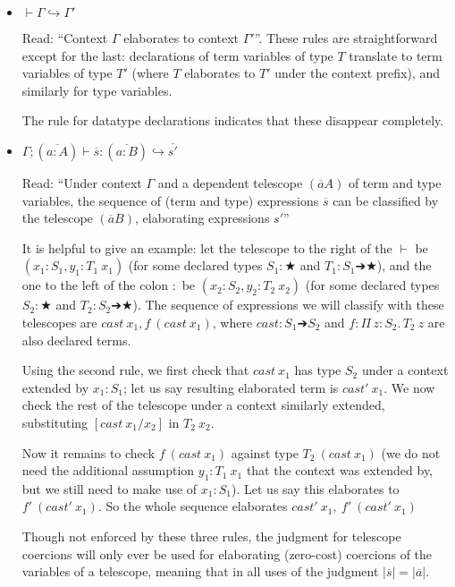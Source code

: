 \documentclass{article}
\newcommand{\ann}[2]{#1\! : \! #2}
\newcommand{\abs}[4]{{#1}\, #2\! : \! #3.\, #4}
\newcommand{\vars}[1]{{\overline{#1}}}
\newcommand{\elab}{\hookrightarrow}
\begin{document}
\begin{itemize}
\item \(\vdash \Gamma \elab \Gamma'\)

  Read: ``Context $\Gamma$ elaborates to context $\Gamma'$''. These rules are
  straightforward except for the last: declarations of term variables of type
  $T$ translate to term variables of type $T'$ (where $T$ elaborates to $T'$
  under the context prefix), and similarly for type variables.

  The rule for datatype declarations indicates that these disappear completely.

\item \(\Gamma ; (\vars{\ann{a}{A}}) \vdash \vars{s} : (\vars{\ann{a}{B}}) \elab
  \vars{s'}\)

  Read: ``Under context $\Gamma$ and a dependent telescope $(\vars{a}{A})$ of
  term and type variables, the sequence of (term and type) expressions
  $\vars{s}$ can be classified by the telescope $(\vars{a}{B})$, elaborating
  expressions $s'$''

  It is helpful to give an example: let the telescope to the right of the
  $\vdash$ be $(\ann{x_1}{S_1},\ann{y_1}{T_1\ x_1})$ (for some declared types $S_1 :
  ★$ and $T_1 : S_1 ➔ ★$), and the one to the left of the colon $:$ be
  $(\ann{x_2}{S_2},\ann{y_2}{T_2\ x_2})$ (for some declared types $S_2 : ★$ and $T_2 :
  S_2 ➔ ★$). The sequence of expressions we will classify with these telescopes
  are \(cast\ x_1, f\ (cast\ x_1)\), where $cast : S_1 ➔ S_2$ and $f :
  \abs{Π}{z}{S_2}{T_2\ z}$ are also declared terms.

  Using the second rule, we first check that $cast\ x_1$ has type $S_2$ under a
  context extended by $\ann{x_1}{S_1}$; let us say resulting elaborated term is
  $cast'\ x_1$. We now check the rest of the telescope under a context similarly
  extended, substituting $[cast\ x_1/x_2]$ in $T_2\ x_2$.

  Now it remains to check $f\ (cast\ x_1)$ against type $T_2\ (cast\ x_1)$ (we
  do not need the additional assumption $\ann{y_1}{T_1\ x_1}$ that the context
  was extended by, but we still need to make use of $\ann{x_1}{S_1}$).
  Let us say this elaborates to $f'\ (cast'\ x_1)$. So the whole sequence
  elaborates $cast'\ x_1,\ f'\ (cast'\ x_1)$

  Though not enforced by these three rules, the judgment for telescope coercions
  will only ever be used for elaborating (zero-cost) coercions of the variables
  of a telescope, meaning that in all uses of the judgment $|\vars{s}| = |\vars{a}|$.
\end{itemize}
\end{document}
